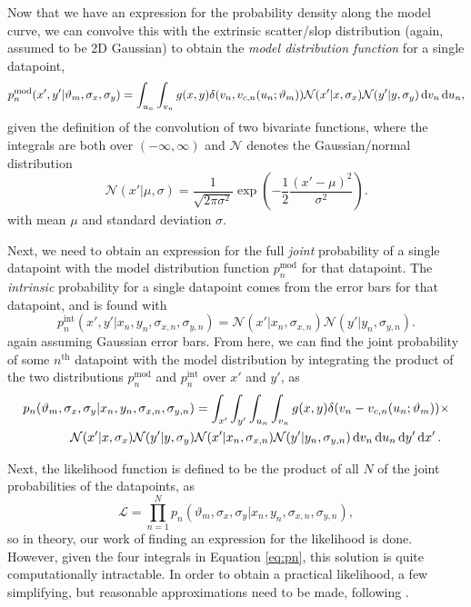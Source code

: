 Now that we have an expression for the probability density along the model curve, we can convolve this with the extrinsic scatter/slop distribution (again, assumed to be 2D Gaussian) to obtain the \textit{model distribution function} for a single datapoint,
\begin{equation}\label{eq:pnmod}
    p_n^\text{mod}(x',y'|\vartheta_m,\sigma_x,\sigma_y)=\displaystyle\int_{u_n}\int_{v_n}g(x,y)\delta(v_n, v_{c,n}(u_n;\vartheta_m))\mathcal{N}(x'|x,\sigma_x)\mathcal{N}(y'|y,\sigma_y)\mathop{}\!\mathrm{d} v_n\mathop{}\!\mathrm{d} u_n,
\end{equation}
given the definition of the convolution of two bivariate functions, where the integrals are both over $(-\infty,\infty)$ and $\mathcal{N}$ denotes the Gaussian/normal distribution
\begin{equation}
\label{eq:symnorm}
    \mathcal{N}(x'|\mu,\sigma) = \frac{1}{\sqrt{2\pi\sigma^2}}\exp\left(-\frac{1}{2}{\frac{(x'-\mu)^2}{\sigma^2}}\right).
\end{equation}
with mean $\mu$ and standard deviation $\sigma$.

Next, we need to obtain an expression for the full \textit{joint} probability of a single datapoint with the model distribution function $p_n^\text{mod}$ for that datapoint. The \textit{intrinsic} probability for a single datapoint comes from the error bars for that datapoint, and is found with
\begin{equation}\label{eq:pnint}
    p_n^\text{int}(x',y'|x_n,y_n,\sigma_{x,n}, \sigma_{y,n}) = \mathcal{N}(x'|x_n,\sigma_{x,n})\mathcal{N}(y'|y_n,\sigma_{y,n}).
\end{equation}
again assuming Gaussian error bars. From here, we can find the joint probability of some $n^\text{th}$ datapoint with the model distribution by integrating the product of the two distributions $p_n^\text{mod}$ and $p_n^\text{int}$ over $x'$ and $y'$, as
\begin{align}\label{eq:pn}
p_n(\vartheta_m,\sigma_x,\sigma_y|x_n,y_n,\sigma_{x,n},\sigma_{y,n}) &= \nonumber
\int_{x^\prime}\int_{y^\prime}\int_{u_n}\int_{v_n}{g(x,y)\delta(v_n-v_{c,n}(u_n;\vartheta_m))} \times \nonumber \\
\mathcal{N}(x'|x,\sigma_x)\mathcal{N}(y'|y,\sigma_y)&\mathcal{N}(x'|x_n,\sigma_{x,n})\mathcal{N}(y'|y_n,\sigma_{y,n})\mathop{}\!\mathrm{d} v_n \mathop{}\!\mathrm{d} u_n \mathop{}\!\mathrm{d} y^\prime \mathop{}\!\mathrm{d} x^\prime \, .
\end{align}

Next, the likelihood function is defined to be the product of all $N$ of the joint probabilities of the datapoints, as
\begin{equation}\label{eq:likelibasic}
    \mathcal{L}=\prod\limits_{n=1}^Np_n(\vartheta_m,\sigma_x,\sigma_y|x_n,y_n,\sigma_{x,n},\sigma_{y,n}),
\end{equation}
so in theory, our work of finding an expression for the likelihood is done. However, given the four integrals in Equation \eqref{eq:pn}, this solution is quite computationally intractable. In order to obtain a practical likelihood, a few simplifying, but reasonable approximations need to be made, following \textcite{trotter}.

